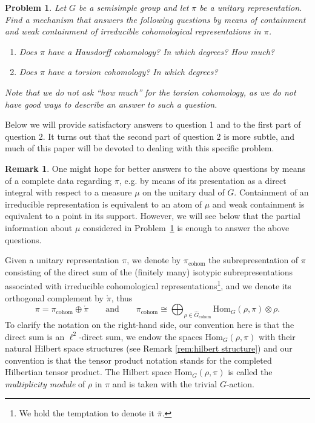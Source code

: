 \documentclass[12pt,reqno]{amsart}
\newtheorem{prob}[theorem]{Problem}
\theoremstyle{definition}
\newtheorem{remark}[theorem]{Remark}
\begin{document}
\begin{prob} \label{prob:main}
    Let $G$ be a semisimple group and let $\pi$ be a unitary representation.
    Find a mechanism that answers the following questions by means 
    of \emph{containment} and \emph{weak containment} of irreducible cohomological representations in $\pi$.
\begin{enumerate}
    \item Does $\pi$ have a Hausdorff cohomology? In which degrees? How much?
    \item Does $\pi$ have a torsion cohomology? In which degrees?
\end{enumerate}
Note that we do not ask ``how much'' for the torsion cohomology, as we do not have good ways to describe an answer to such a question.
\end{prob}

Below we will provide satisfactory answers to question 1 and to the first part of question 2. It turns out that the second part of question 2 is more subtle, and much of this paper will be devoted to dealing with this specific problem.

\begin{remark} \label{rem:measure?}
    One might hope for better answers to the above questions by means of a complete data regarding $\pi$, e.g. by means of its presentation as a direct integral with respect to a measure $\mu$ on the unitary dual of $G$. Containment of an irreducible representation is equivalent to an atom of $\mu$ and weak containment is equivalent to a point in its support. 
    However, we will see below that the partial information about $\mu$ considered in Problem~\ref{prob:main} is enough to answer the above questions.
\end{remark}

Given a unitary representation $\pi$, we denote by $\pi_{\mathrm{cohom}}$ the subrepresentation of $\pi$ consisting of the direct sum of the (finitely many)  isotypic subrepresentations associated with irreducible cohomological representations\footnote{We hold the temptation to denote it $\bar{\pi}$.}, and we denote its orthogonal complement by $\mathring{\pi}$, thus
\[ \pi=\pi_{\mathrm{cohom}} \oplus \mathring{\pi} \qquad \mbox{and} \qquad 
\pi_{\mathrm{cohom}} \cong 
\bigoplus_{\rho \in \widehat{G}_{\mathrm{cohom}}} \mathrm{Hom}_G(\rho,\pi)\otimes \rho. \]
To clarify the notation on the right-hand side, our convention here is that the direct sum is an $\ell^2$-direct sum, we endow the spaces $\mathrm{Hom}_G(\rho,\pi)$ with their natural Hilbert space structures (see Remark \ref{rem:hilbert structure}) and our convention is that the tensor product notation stands for the completed Hilbertian tensor product. The Hilbert space $\mathrm{Hom}_G(\rho,\pi)$ is called the \emph{multiplicity module} of $\rho$ in $\pi$ and is taken with the trivial $G$-action.
\end{document}
